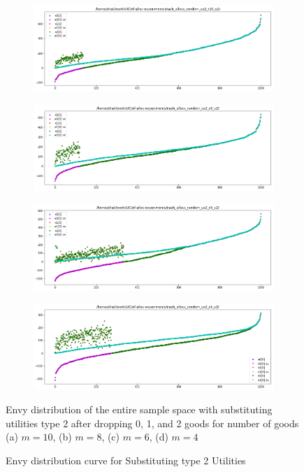 \begin{figure}[h!]
  \centering
  \begin{subfigure}[b]{0.47\linewidth}
    \includegraphics[width=\linewidth]{images/subst2/pdf_subst2_10.png}
    \caption{}
  \end{subfigure}
  \begin{subfigure}[b]{0.47\linewidth}
    \includegraphics[width=\linewidth]{images/subst2/pdf_subst2_8.png}
    \caption{}
  \end{subfigure}
  \begin{subfigure}[b]{0.47\linewidth}
    \includegraphics[width=\linewidth]{images/subst2/pdf_subst2_6.png}
    \caption{}
  \end{subfigure}
  \begin{subfigure}[b]{0.47\linewidth}
    \includegraphics[width=\linewidth]{images/subst2/pdf_subst2_4.png}
    \caption{}
  \end{subfigure}
  \caption{Envy distribution curve for Substituting type 2 Utilities}
  \label{fig_efk_dist_curve_subst2}
  \small
    Envy distribution of the entire sample space with substituting utilities type 2 after dropping 0, 1, and 2 goods for number of goods (a) $m = 10$, (b) $m = 8$, (c) $m = 6$, (d) $m = 4$
\end{figure}


